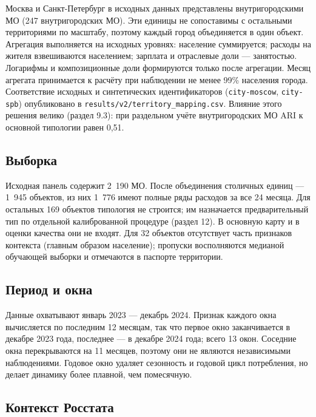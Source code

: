 \documentclass[11pt,a4paper]{article}
\begin{document}
Москва и Санкт-Петербург в исходных данных представлены внутригородскими МО (247 внутригородских МО). Эти единицы не сопоставимы с остальными территориями по масштабу, поэтому каждый город объединяется в один объект. Агрегация выполняется на исходных уровнях: население суммируется; расходы на жителя взвешиваются населением; зарплата и отраслевые доли --- занятостью. Логарифмы и композиционные доли формируются только после агрегации. Месяц агрегата принимается к расчёту при наблюдении не менее 99\% населения города. Соответствие исходных и синтетических идентификаторов (\texttt{city-\allowbreak{}moscow}, \texttt{city-\allowbreak{}spb}) опубликовано в \texttt{results/\allowbreak{}v2/\allowbreak{}territory\_\allowbreak{}mapping.\allowbreak{}csv}. Влияние этого решения велико (раздел 9.3): при раздельном учёте внутригородских МО ARI к основной типологии равен 0,51.

\subsection{Выборка}\label{ux432ux44bux431ux43eux440ux43aux430}

Исходная панель содержит 2~190 МО. После объединения столичных единиц --- 1~945 объектов, из них 1~776 имеют полные ряды расходов за все 24 месяца. Для остальных 169 объектов типология не строится; им назначается предварительный тип по отдельной калиброванной процедуре (раздел 12). В основную карту и в оценки качества они не входят. Для 32 объектов отсутствует часть признаков контекста (главным образом население); пропуски восполняются медианой обучающей выборки и отмечаются в паспорте территории.

\subsection{Период и окна}\label{ux43fux435ux440ux438ux43eux434-ux438-ux43eux43aux43dux430}

Данные охватывают январь 2023 --- декабрь 2024. Признак каждого окна вычисляется по последним 12 месяцам, так что первое окно заканчивается в декабре 2023 года, последнее --- в декабре 2024 года; всего 13 окон. Соседние окна перекрываются на 11 месяцев, поэтому они не являются независимыми наблюдениями. Годовое окно удаляет сезонность и годовой цикл потребления, но делает динамику более плавной, чем помесячную.

\subsection{Контекст Росстата}\label{ux43aux43eux43dux442ux435ux43aux441ux442-ux440ux43eux441ux441ux442ux430ux442ux430}
\end{document}

